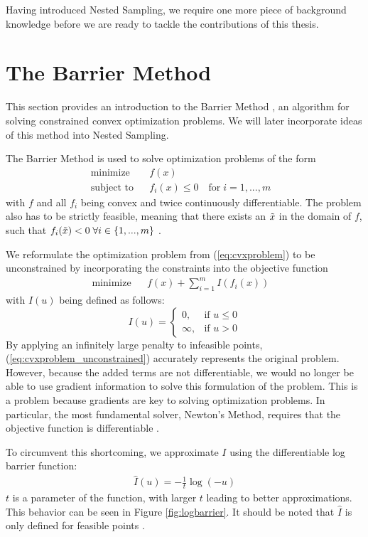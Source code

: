 \documentclass[12pt, a4paper]{report}
\begin{document}
Having introduced Nested Sampling, we require one more piece of background knowledge before we are ready to tackle the contributions of this thesis.
\FloatBarrier
\section{The Barrier Method}
This section provides an introduction to the Barrier Method \cite[568]{boyd}, an algorithm for solving constrained convex optimization problems.
We will later incorporate ideas of this method into Nested Sampling.

The Barrier Method is used to solve optimization problems of the form
\begin{align}
    &\textrm{minimize} && f(x) && \nonumber\\
    &\textrm{subject to}  && f_i(x) \leq 0 \quad \textrm{for} \; i=1,...,m &&
    \label{eq:cvxproblem}
\end{align}
with $f$ and all $f_i$ being convex and twice continuously differentiable.
The problem also has to be strictly feasible, meaning that there exists an $\Tilde{x}$ in the domain of $f$, such that $f_i(\Tilde{x}) < 0 \; \forall i \in \{1,...,m\}$ \cite[561]{boyd}.

We reformulate the optimization problem from (\ref{eq:cvxproblem}) to be unconstrained by incorporating the constraints into the objective function
\begin{align}
    &\textrm{minimize} && f(x) + \sum_{i=1}^m I(f_i(x))&& \label{eq:cvxproblem_unconstrained}
\end{align}
with $I(u)$ being defined as follows:
\begin{equation}
    I(u) = \begin{cases}
        0,      & \text{if }  u \leq 0\\
        \infty, & \text{if }  u > 0
        \end{cases} \label{eq:exact_barrier_function}
\end{equation}
By applying an infinitely large penalty to infeasible points, (\ref{eq:cvxproblem_unconstrained}) accurately represents the original problem.
However, because the added terms are not differentiable, we would no longer be able to use gradient information to solve this formulation of the problem.
This is a problem because gradients are key to solving optimization problems.
In particular, the most fundamental solver, Newton's Method, requires that the objective function is differentiable \cite[563]{boyd}.

To circumvent this shortcoming, we approximate $I$ using the differentiable log barrier function:
\begin{align}
    \hat{I}(u)= -\frac{1}{t}\log(-u) \label{eq:log_barrier_function}
\end{align}
$t$ is a parameter of the function, with larger $t$ leading to better approximations.
This behavior can be seen in Figure \ref{fig:logbarrier}.
It should be noted that $\hat{I}$ is only defined for feasible points \cite[563]{boyd}.
\end{document}
